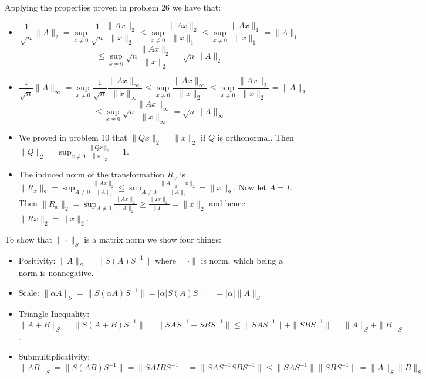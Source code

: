 \documentclass[12pt]{article}
\newenvironment{problem}[2][Problem]{\begin{trivlist}
\item[\hskip \labelsep {\bfseries #1}\hskip \labelsep {\bfseries #2}]}{\end{trivlist}}
\begin{document}
 
\begin{problem}{28.} Applying the properties proven in problem 26 we have that:
\begin{itemize}
\item [(i)]   $$\frac{1}{\sqrt{n}}\|A\|_2 =  \sup_{x\neq0}\frac{1}{\sqrt{n}} \frac{\|Ax\|_2}{\|x\|_2} \leq  \sup_{x\neq0} \frac{\|Ax\|_2}{\|x\|_1} \leq  \sup_{x\neq0} \frac{\|Ax\|_1}{\|x\|_1} = \|A\|_1  $$
$$ \leq  \sup_{x\neq0} \sqrt{n}\frac{\|Ax\|_2}{\|x\|_2}= \sqrt{n}\|A\|_2 $$
\item [(ii)] $$ \frac{1}{\sqrt{n}}\|A\|_\infty = \sup_{x\neq0} \frac{1}{\sqrt{n}} \frac{\|Ax\|_\infty}{\|x\|_\infty} \leq  \sup_{x\neq0}  \frac{\|Ax\|_{\infty}}{\|x\|_2} \leq \sup_{x\neq0}  \frac{\|Ax\|_2}{\|x\|_2} = \|A\|_2 $$ $$ \leq  \sup_{x\neq0} \sqrt{n}\frac{\|Ax\|_\infty}{\|x\|_\infty} = \sqrt{n}\|A\|_\infty$$
\end{itemize} 
\end{problem}


\begin{problem}{29.} \hfill
\begin{itemize}
\item[(i)] We proved in problem 10 that $\|Qx\|_2 = \|x\|_2$ if $Q$ is orthonormal. Then $\|Q\|_2 = \sup_{x\neq 0} \frac{\|Qx\|_2}{\|x\|_2} = 1$.  
\item[(ii)] The induced norm of the transformation $R_x$ is $\|R_x\|_2 = \sup_{A\neq 0} \frac{\|Ax\|_2}{\|A\|_2} \leq \sup_{A\neq 0} \frac{\|A\|_2 \|x\|_2}{\|A\|_2} = \|x\|_2$. Now let $A = I$. Then  $\|R_x\|_2 = \sup_{A\neq 0} \frac{\|Ax\|_2}{\|A\|_2} \geq \frac{\|Ix\|_2}{\|I\|} = \|x\|_2$ and hence $\|Rx\|_2 = \|x\|_2$. 
\end{itemize}
\end{problem}


\begin{problem}{30.} To show that $\| \cdot \|_S$ is a matrix norm we show four things:
\begin{itemize}
\item [(i)]  Positivity: $\|A\|_S = \|S(A)S^{-1}\|$ where $\| \cdot \|$ is norm, which being a norm is nonnegative. 
\item [(ii)] Scale: $\|\alpha A\|_S = \|S(\alpha A)S^{-1}\| = |\alpha| S(A)S^{-1}\|= |\alpha| \| A\|_S$
\item [(iii)] Triangle Inequality: $\|A+B\|_S =  \|S(A + B)S^{-1}\| = \|SAS^{-1} + SBS^{-1}\| \leq  \|SAS^{-1}\| + \|SBS^{-1}\| = \|A\|_S + \|B\|_S$. 
\item [(iv)] Submultiplicativity: $\|AB\|_S = \|S(AB)S^{-1}\| = \|SAIBS^{-1}\|  = \|SAS^{-1}SBS^{-1}\| \leq \|SAS^{-1}\|\|SBS^{-1}\| = \|A\|_S\|B\|_S$
\end{itemize} 
\end{problem}
\end{document}
